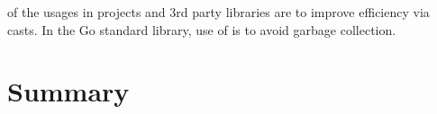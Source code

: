 \begin{answerToRQ}[\ref{rq:purpose}]
     of the \unsafe{} usages in projects and 3rd party libraries are to improve efficiency via
    \unsafe{} casts.
    In the Go standard library,  use of \unsafe{} is to avoid garbage collection.
\end{answerToRQ}



\section{Summary}\label{sec:go-geiger:summary}

